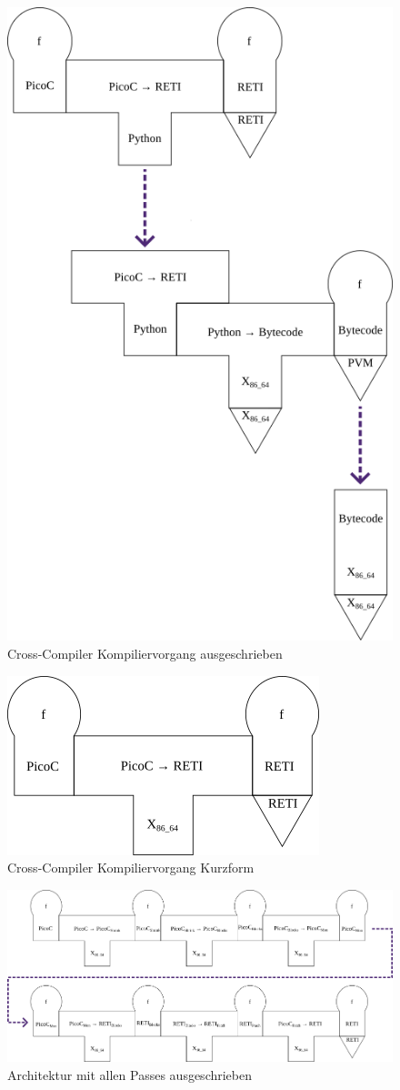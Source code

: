 


\begin{figure}[H]
  \centering
  \includegraphics[width=0.5\linewidth]{./figures/summarized_cross_compiler.png}
  \caption{Cross-Compiler Kompiliervorgang ausgeschrieben}
\end{figure}

\begin{figure}[H]
  \centering
  \includegraphics[width=0.33\linewidth]{./figures/compiliervorang_mit_machiene.png}
  \caption{Cross-Compiler Kompiliervorgang Kurzform}
\end{figure}

\begin{figure}[H]
  \centering
  \includegraphics[width=\linewidth]{./figures/passes.png}
  \caption{Architektur mit allen Passes ausgeschrieben}
\end{figure}

